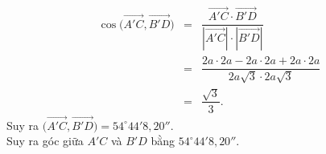 \begin{bt}
{\begin{enumerate}
\begin{eqnarray*}
				\cos\Big(\overrightarrow{A'C},\overrightarrow{B'D}\Big)&=&\dfrac{\overrightarrow{A'C}\cdot \overrightarrow{B'D}}{\left|\overrightarrow{A'C}\right|\cdot \left|\overrightarrow{B'D}\right|}\\
				&=&\dfrac{2a\cdot 2a-2a\cdot 2a+2a\cdot 2a}{2a\sqrt 3\cdot 2a\sqrt 3}\\
				&=&\dfrac{\sqrt 3}{3}.
			\end{eqnarray*}
			Suy ra $\Big(\overrightarrow{A'C},\overrightarrow{B'D}\Big)=54^\circ44'8{,}20''$.\\
			Suy ra góc giữa $A'C$ và $B'D$ bằng $54^\circ44'8{,}20''$.
		\end{enumerate}
	}
\end{bt}

